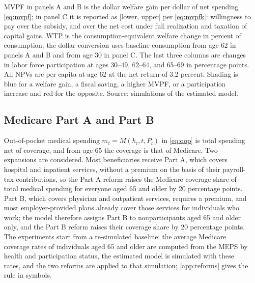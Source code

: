 \begin{table}[!tp]
\begin{threeparttable}
\begin{tablenotes}[flushleft]
MVPF in panels A and B is the dollar welfare gain per dollar of net spending \eqref{eq:mvpf}; in panel C it is reported as [lower, upper] per \eqref{eq:mvpfk}: willingness to pay over the subsidy, and over the net cost under full realization and taxation of capital gains. WTP is the consumption-equivalent welfare change in percent of consumption; the dollar conversion uses baseline consumption from age 62 in panels A and B and from age 30 in panel C. The last three columns are changes in labor force participation at ages 30--49, 62--64, and 65--69 in percentage points. All NPVs are per capita at age 62 at the net return of 3.2 percent. Shading is blue for a welfare gain, a fiscal saving, a higher MVPF, or a participation increase and red for the opposite. Source: simulations of the estimated model.
\end{tablenotes}
\end{threeparttable}
\end{table}

\subsection{Medicare Part A and Part B}\label{subsec:medicare}

Out-of-pocket medical spending $m_t=M(h_t,t,P_t)$ in \eqref{eq:oop} is total spending net of coverage, and from age 65 the coverage is that of Medicare. %
Two expansions are considered. Most beneficiaries receive Part A, which covers hospital and inpatient services, without a premium on the basis of their payroll-tax contributions, so the Part A reform raises the Medicare coverage share of total medical spending for everyone aged 65 and older by 20 percentage points. %
Part B, which covers physician and outpatient services, requires a premium, and most employer-provided plans already cover those services for individuals who work; the model therefore assigns Part B to nonparticipants aged 65 and older only, and the Part B reform raises their coverage share by 20 percentage points. %
The experiments start from a re-simulated baseline: the average Medicare coverage rates of individuals aged 65 and older are computed from the MEPS by health and participation status, the estimated model is simulated with these rates, and the two reforms are applied to that simulation; \autoref{app:reforms} gives the rule in symbols. %

